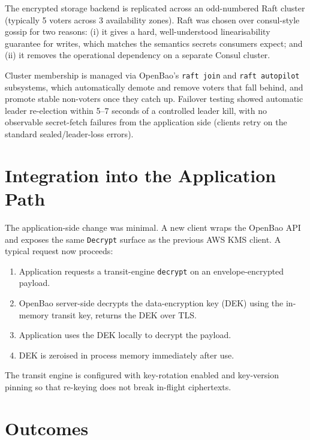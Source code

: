 \documentclass[12pt,a4paper,oneside]{report}
\begin{document}
The encrypted storage backend is replicated across an odd-numbered Raft cluster (typically 5 voters across 3 availability zones). Raft was chosen over consul-style gossip for two reasons: (i) it gives a hard, well-understood linearisability guarantee for writes, which matches the semantics secrets consumers expect; and (ii) it removes the operational dependency on a separate Consul cluster.

Cluster membership is managed via OpenBao's \texttt{raft join} and \texttt{raft autopilot} subsystems, which automatically demote and remove voters that fall behind, and promote stable non-voters once they catch up. Failover testing showed automatic leader re-election within 5--7 seconds of a controlled leader kill, with no observable secret-fetch failures from the application side (clients retry on the standard sealed/leader-loss errors).

\section{Integration into the Application Path}

The application-side change was minimal. A new client wraps the OpenBao API and exposes the same \texttt{Decrypt} surface as the previous AWS KMS client. A typical request now proceeds:

\begin{enumerate}[leftmargin=*]
    \item Application requests a transit-engine \texttt{decrypt} on an envelope-encrypted payload.
    \item OpenBao server-side decrypts the data-encryption key (DEK) using the in-memory transit key, returns the DEK over TLS.
    \item Application uses the DEK locally to decrypt the payload.
    \item DEK is zeroised in process memory immediately after use.
\end{enumerate}

The transit engine is configured with key-rotation enabled and key-version pinning so that re-keying does not break in-flight ciphertexts.

\section{Outcomes}
\end{document}
